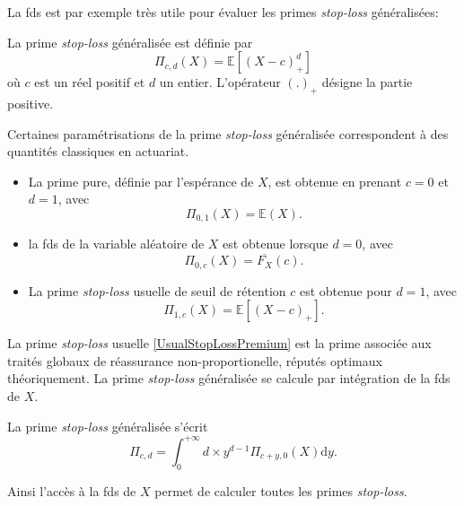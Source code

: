 La \gls{fds} est par exemple très utile pour évaluer les primes \textit{stop-loss} généralisées:
\begin{Def}\label{StopLossPremiumDefinition}
La prime \textit{stop-loss} généralisée est définie par 
\begin{equation}\label{StopLossPremium}
\Pi_{c,d}(X)=\mathbb{E}\left[(X-c)^{d}_{+}\right]
\end{equation}
où $c$ est un réel positif et $d$ un entier. L\rq{}opérateur $(.)_{+}$ désigne la partie positive. 
\end{Def}
Certaines paramétrisations de la prime \textit{stop-loss} généralisée correspondent à des quantités classiques en actuariat. 
\begin{itemize}
\item La prime pure, définie par l\rq{}espérance de $X$, est obtenue en prenant $c=0$ et $d=1$, avec 
\begin{equation}\label{PurePremium}
\Pi_{0,1}(X)=\mathbb{E}(X).
\end{equation}
\item la \gls{fds} de la variable aléatoire de $X$ est obtenue lorsque $d=0$, avec 
\begin{equation*}
\Pi_{0,c}(X)=\overline{F_{X}}(c).
\end{equation*}
\item La prime \textit{stop-loss} usuelle de seuil de rétention $c$ est obtenue pour $d=1$, avec 
\begin{equation}\label{UsualStopLossPremium}
\Pi_{1,c}(X)=\mathbb{E}\left[(X-c)_{+}\right].
\end{equation}
\end{itemize}
La prime \textit{stop-loss} usuelle \eqref{UsualStopLossPremium} est la prime associée aux traités globaux de réassurance non-proportionelle, réputés optimaux théoriquement. La prime \textit{stop-loss} généralisée se calcule par intégration de la \gls{fds} de $X$.
\begin{Prop}\label{StopLossPremiumSurvivalFunction}
La prime \textit{stop-loss} généralisée s\rq{}écrit
\begin{equation}\label{StopLossPremiumIntegral}
\Pi_{c,d}=\int_{0}^{+\infty}d\times y^{d-1}\Pi_{c+y,0}\left(X\right)\text{d}y.
\end{equation}
\end{Prop}
Ainsi l\rq{}accès à la \gls{fds} de $X$ permet de calculer toutes les primes \textit{stop-loss}.\\

